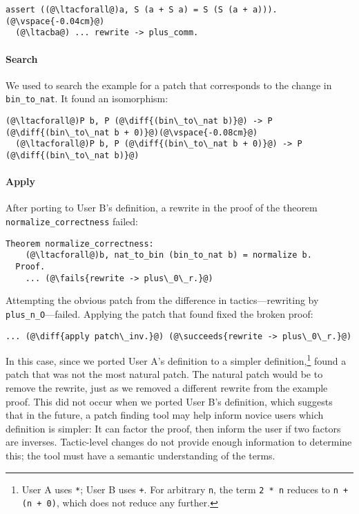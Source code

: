 \begin{lstlisting}[language=coq]
  assert ((@\ltacforall@)a, S (a + S a) = S (S (a + a))).(@\vspace{-0.04cm}@)
  (@\ltacba@) ... rewrite -> plus_comm.
\end{lstlisting} %

\paragraph{Search} We used \sysname to search the example
for a patch that corresponds to the change in \lstinline{bin_to_nat}.
It found an isomorphism:

\begin{lstlisting}[language=coq]
  (@\ltacforall@)P b, P (@\diff{(bin\_to\_nat b)}@) -> P (@\diff{(bin\_to\_nat b + 0)}@)(@\vspace{-0.08cm}@)
  (@\ltacforall@)P b, P (@\diff{(bin\_to\_nat b + 0)}@) -> P (@\diff{(bin\_to\_nat b)}@)
\end{lstlisting}

\paragraph{Apply} After porting to User B's definition, a rewrite in the proof of the theorem
\lstinline{normalize_correctness} failed:

\begin{lstlisting}[language=coq]
  Theorem normalize_correctness:
    (@\ltacforall@)b, nat_to_bin (bin_to_nat b) = normalize b.
  Proof.
    ... (@\fails{rewrite -> plus\_0\_r.}@)
\end{lstlisting}

Attempting the obvious patch from the difference in tactics---rewriting by \lstinline{plus_n_O}---failed.
Applying the patch that \sysname found fixed the broken proof:

\begin{lstlisting}[language=coq]
   ... (@\diff{apply patch\_inv.}@) (@\succeeds{rewrite -> plus\_0\_r.}@)
\end{lstlisting}

In this case, since we ported User A's definition to a simpler 
definition,\footnote{User A uses \lstinline{*}; User B uses \lstinline{+}. 
For arbitrary \lstinline{n}, the term \lstinline{2 * n} reduces to \lstinline{n + (n + 0)}, which does not reduce any further.}
\sysname found a patch that was not the most natural patch.
The natural patch would be to remove the rewrite, just as we removed a different rewrite from the example proof.
This did not occur when we ported User B's definition,
which suggests that in the future, a patch finding tool may help inform novice users which definition is simpler:
It can factor the proof,  
then inform the user if two factors are inverses.
Tactic-level changes do not provide enough information to determine this; the tool must have a semantic
understanding of the terms.

